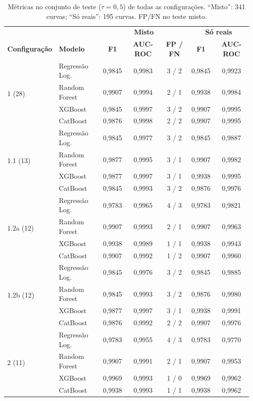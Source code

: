 \begin{table}[htbp]
\centering
\caption{Métricas no conjunto de teste ($\tau = 0{,}5$) de todas as configurações. ``Misto'': 341 curvas; ``Só reais'': 195 curvas. FP/FN no teste misto.}
\label{tab:teste_todas}
\footnotesize
\begin{tabular}{llccccc}
\hline
 & & \multicolumn{3}{c}{\textbf{Misto}} & \multicolumn{2}{c}{\textbf{Só reais}} \\
\textbf{Configuração} & \textbf{Modelo} & \textbf{F1} & \textbf{AUC-ROC} & \textbf{FP / FN} & \textbf{F1} & \textbf{AUC-ROC} \\
\hline
\multirow{4}{*}{1 (28)} & Regressão Log. & 0{,}9845 & 0{,}9983 & 3 / 2 & 0{,}9845 & 0{,}9923 \\
 & Random Forest & 0{,}9907 & 0{,}9994 & 2 / 1 & 0{,}9938 & 0{,}9984 \\
 & XGBoost & 0{,}9845 & 0{,}9997 & 3 / 2 & 0{,}9907 & 0{,}9995 \\
 & CatBoost & 0{,}9876 & 0{,}9998 & 2 / 2 & 0{,}9907 & 0{,}9995 \\
\hline
\multirow{4}{*}{1.1 (13)} & Regressão Log. & 0{,}9845 & 0{,}9977 & 3 / 2 & 0{,}9845 & 0{,}9887 \\
 & Random Forest & 0{,}9877 & 0{,}9995 & 3 / 1 & 0{,}9907 & 0{,}9982 \\
 & XGBoost & 0{,}9877 & 0{,}9997 & 3 / 1 & 0{,}9938 & 0{,}9995 \\
 & CatBoost & 0{,}9845 & 0{,}9993 & 3 / 2 & 0{,}9876 & 0{,}9976 \\
\hline
\multirow{4}{*}{1.2a (12)} & Regressão Log. & 0{,}9783 & 0{,}9965 & 4 / 3 & 0{,}9783 & 0{,}9821 \\
 & Random Forest & 0{,}9907 & 0{,}9993 & 2 / 1 & 0{,}9907 & 0{,}9963 \\
 & XGBoost & 0{,}9938 & 0{,}9989 & 1 / 1 & 0{,}9938 & 0{,}9943 \\
 & CatBoost & 0{,}9907 & 0{,}9992 & 1 / 2 & 0{,}9907 & 0{,}9960 \\
\hline
\multirow{4}{*}{1.2b (12)} & Regressão Log. & 0{,}9845 & 0{,}9976 & 3 / 2 & 0{,}9845 & 0{,}9885 \\
 & Random Forest & 0{,}9845 & 0{,}9993 & 3 / 2 & 0{,}9876 & 0{,}9980 \\
 & XGBoost & 0{,}9877 & 0{,}9997 & 3 / 1 & 0{,}9938 & 0{,}9991 \\
 & CatBoost & 0{,}9876 & 0{,}9992 & 2 / 2 & 0{,}9907 & 0{,}9976 \\
\hline
\multirow{4}{*}{2 (11)} & Regressão Log. & 0{,}9783 & 0{,}9955 & 4 / 3 & 0{,}9783 & 0{,}9770 \\
 & Random Forest & 0{,}9907 & 0{,}9991 & 2 / 1 & 0{,}9907 & 0{,}9953 \\
 & XGBoost & 0{,}9969 & 0{,}9993 & 1 / 0 & 0{,}9969 & 0{,}9962 \\
 & CatBoost & 0{,}9938 & 0{,}9993 & 1 / 1 & 0{,}9938 & 0{,}9962 \\
\hline
\end{tabular}
\end{table}
